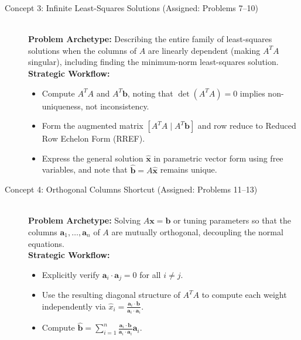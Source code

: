\documentclass[11pt, letterpaper]{article}
\theoremstyle{definition}
\theoremstyle{remark}
\begin{document}
\begin{description}
    \item[Concept 3: Infinite Least-Squares Solutions (Assigned: Problems 7--10)] \hfill \\
    \textbf{Problem Archetype:} Describing the entire family of least-squares solutions when the columns of $A$ are linearly dependent (making $A^T A$ singular), including finding the minimum-norm least-squares solution.\\
    \textbf{Strategic Workflow:}
    \begin{itemize}
        \item Compute $A^T A$ and $A^T \mathbf{b}$, noting that $\det(A^T A) = 0$ implies non-uniqueness, not inconsistency.
        \item Form the augmented matrix $[A^T A \mid A^T \mathbf{b}]$ and row reduce to Reduced Row Echelon Form (RREF).
        \item Express the general solution $\hat{\mathbf{x}}$ in parametric vector form using free variables, and note that $\hat{\mathbf{b}} = A\hat{\mathbf{x}}$ remains unique.
    \end{itemize}

    \item[Concept 4: Orthogonal Columns Shortcut (Assigned: Problems 11--13)] \hfill \\
    \textbf{Problem Archetype:} Solving $A\mathbf{x} = \mathbf{b}$ or tuning parameters so that the columns $\mathbf{a}_1, \dots, \mathbf{a}_n$ of $A$ are mutually orthogonal, decoupling the normal equations.\\
    \textbf{Strategic Workflow:}
    \begin{itemize}
        \item Explicitly verify $\mathbf{a}_i \cdot \mathbf{a}_j = 0$ for all $i \neq j$.
        \item Use the resulting diagonal structure of $A^T A$ to compute each weight independently via $\hat{x}_i = \frac{\mathbf{a}_i \cdot \mathbf{b}}{\mathbf{a}_i \cdot \mathbf{a}_i}$.
        \item Compute $\hat{\mathbf{b}} = \sum_{i=1}^n \frac{\mathbf{a}_i \cdot \mathbf{b}}{\mathbf{a}_i \cdot \mathbf{a}_i}\mathbf{a}_i$.
    \end{itemize}


\end{description}
\end{document}
